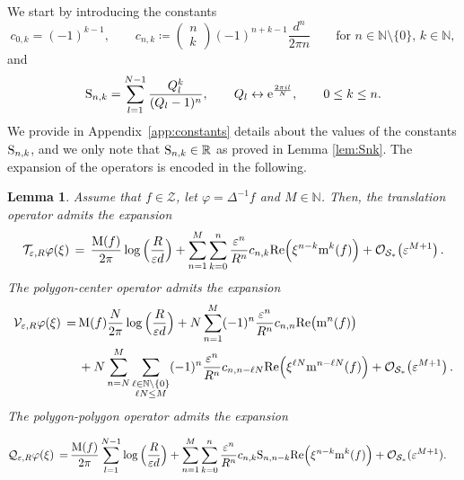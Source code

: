\documentclass[11pt,reqno,a4paper]{amsart}
\def\eps{\varepsilon}
\def\epsilon{\varepsilon}
\def\e{{\rm e}}
\def\RR {\mathbb{R}}
\def\NN {\mathbb{N}}
\def\Re{{\rm Re}}
\newcommand{\cO}{\mathcal{O}}
\newcommand{\cQ}{\mathcal{Q}}
\newcommand{\cS}{\mathcal{S}}
\newcommand{\cT}{\mathcal{T}}
\newcommand{\cV}{\mathcal{V}}
\newcommand{\cZ}{\mathcal{Z}}
\newcommand{\mrm}{\mathrm{m}}
\newcommand{\mrM}{\mathrm{M}}
\newcommand{\1}{\mathbbm{1}}
\newtheorem{lemma}[proposition]{Lemma}
\theoremstyle{definition}
\theoremstyle{definition}
\numberwithin{equation}{section}
\begin{document}
We start by introducing the constants 
\begin{equation}
\label{def:cnk}
    c_{0,k}=(-1)^{k-1}, \qquad  c_{n,k}\coloneqq \begin{pmatrix}
    n\\ k
\end{pmatrix}(-1)^{n+k-1}\frac{ d^n}{2\pi n} \qquad \text{for } n\in \NN\setminus\{0\}, \, k\in \NN,
\end{equation}
and
\begin{equation}
\label{def:Snk}
    {\rm S}_{n,k}=\sum_{l=1}^{N-1}\frac{Q_l^k}{(Q_l-1)^n}, \qquad Q_l\leftrightarrow \e^{\frac{2\pi il}{N}}, \qquad 0\leq k\leq n.
\end{equation}
We provide in Appendix~\ref{app:constants} details about the values of the constants ${\rm S}_{n,k}$, and we only note that ${\rm S}_{n,k}\in \RR$ as proved in Lemma \ref{lem:Snk}.
The expansion of the operators is encoded in the following.
\begin{lemma}\label{lem:expansionsR}
    Assume that $f \in \cZ$, let $\varphi = \Delta^{-1}f$ and $M\in \NN$. Then, the translation operator admits the expansion
\begin{equation}\label{Texpansion}
  \cT_{\eps,R}\varphi(\xi) \,=\, \frac{{\rm M}(f)}{2\pi}\log\Big(\frac{R}{\eps d}\Big)
+\sum_{n=1}^M\sum_{k=0}^{n} \frac{\eps^n}{R^n}c_{n,k} \Re\Big(\xi^{n-k}{\rm m}^k(f)\Big) + \cO_{\cS_*}\bigl(\epsilon^{M+1}\bigr)\,.
\end{equation}
The polygon-center operator admits the expansion
\begin{equation}\label{Vexpansion}
  \begin{split}
      \cV_{\eps,R}\varphi(\xi) \,=\,& \mrM(f)\frac{N}{2\pi}\log\Big(\frac{R}{\eps d}\Big)
  +N\sum_{n=1}^M (-1)^n\frac{\eps^n}{R^n}c_{n,n} \Re\big({\rm m}^n(f)\big)\\
&+N\sum_{n=N}^M\sum_{\substack{\ell \in \mathbb{N}\setminus \{0\}\\
\ell N\leq M}}(-1)^n\frac{\eps^n}{R^n} c_{n,n-\ell N} \Re\Big(\xi^{\ell N}\mrm^{n-\ell N}(f)\Big)+\cO_{\cS_*}\bigl(\epsilon^{M+1}\bigr)\,.
        \end{split}
\end{equation}
The polygon-polygon operator admits the expansion


\begin{equation}\label{Qexpansion}
  \begin{split}
\cQ_{\eps,R}\varphi(\xi) \,=&\, \frac{\mrM(f)}{2\pi}\sum_{l=1}^{N-1}\log\Big(\frac{R}{\eps d}\Big)
  +\sum_{n=1}^M \sum_{k=0}^n\frac{\epsilon^n}{R^n}c_{n,k}{\rm S}_{n,n-k}\Re\Big(\xi^{n-k}\mrm^k(f)\Big)+\cO_{\cS_*}(\eps^{M+1}).
        \end{split}
\end{equation}
\end{lemma}
\end{document}
